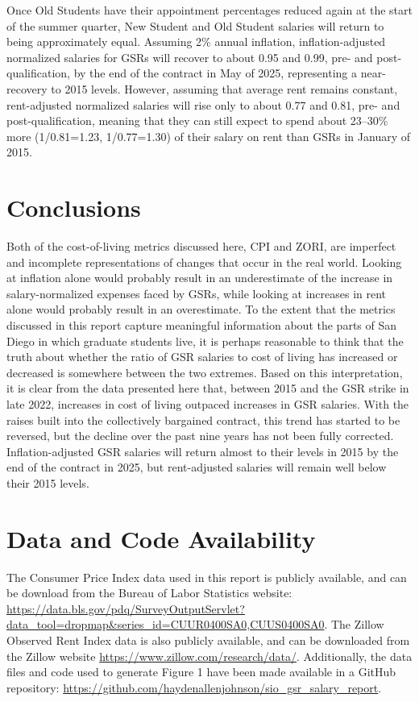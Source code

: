 \documentclass{article}
\begin{document}
Once Old Students have their appointment percentages reduced again at the start of the summer quarter, New Student and Old Student salaries will return to being approximately equal. Assuming 2\% annual inflation, inflation-adjusted normalized salaries for GSRs will recover to about 0.95 and 0.99, pre- and post-qualification, by the end of the contract in May of 2025, representing a near-recovery to 2015 levels. However, assuming that average rent remains constant, rent-adjusted normalized salaries will rise only to about 0.77 and 0.81, pre- and post-qualification, meaning that they can still expect to spend about 23--30\% more (1/0.81=1.23, 1/0.77=1.30) of their salary on rent than GSRs in January of 2015.

\section{Conclusions}

Both of the cost-of-living metrics discussed here, CPI and ZORI, are imperfect and incomplete representations of changes that occur in the real world. Looking at inflation alone would probably result in an underestimate of the increase in salary-normalized expenses faced by GSRs, while looking at increases in rent alone would probably result in an overestimate. To the extent that the metrics discussed in this report capture meaningful information about the parts of San Diego in which graduate students live, it is perhaps reasonable to think that the truth about whether the ratio of GSR salaries to cost of living has increased or decreased is somewhere between the two extremes. Based on this interpretation, it is clear from the data presented here that, between 2015 and the GSR strike in late 2022, increases in cost of living outpaced increases in GSR salaries. With the raises built into the collectively bargained contract, this trend has started to be reversed, but the decline over the past nine years has not been fully corrected. Inflation-adjusted GSR salaries will return almost to their levels in 2015 by the end of the contract in 2025, but rent-adjusted salaries will remain well below their 2015 levels.

\section*{Data and Code Availability}

The Consumer Price Index data used in this report is publicly available, and can be download from the Bureau of Labor Statistics website: \url{https://data.bls.gov/pdq/SurveyOutputServlet?data_tool=dropmap&series_id=CUUR0400SA0,CUUS0400SA0}. The Zillow Observed Rent Index data is also publicly available, and can be downloaded from the Zillow website \url{https://www.zillow.com/research/data/}. Additionally, the data files and code used to generate Figure 1 have been made available in a GitHub repository: \url{https://github.com/haydenallenjohnson/sio_gsr_salary_report}.



\end{document}
